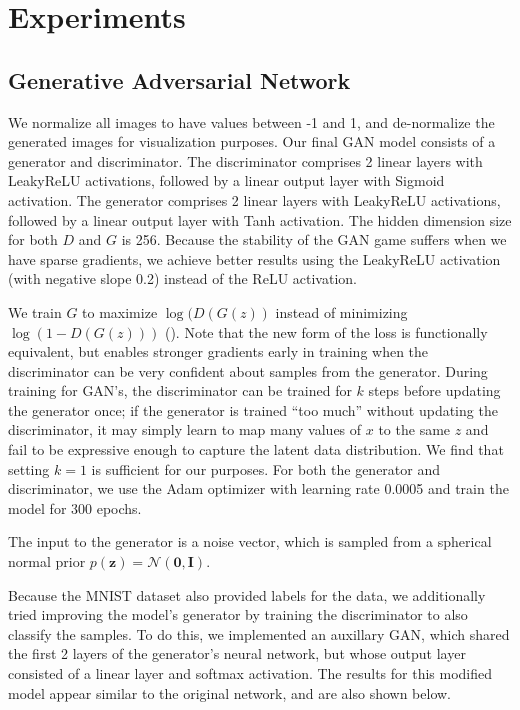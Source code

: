 \documentclass[11pt]{article}
\begin{document}
\section{Experiments}


\subsection{Generative Adversarial Network} 
We normalize all images to have values between -1 and 1, and de-normalize the generated images for visualization purposes. Our final GAN model consists of a generator and discriminator. The discriminator comprises 2 linear layers with LeakyReLU activations, followed by a linear output layer with Sigmoid activation. The generator comprises 2 linear layers with LeakyReLU activations, followed by a linear output layer with Tanh activation. The hidden dimension size for both $D$ and $G$ is 256. Because the stability of the GAN game suffers when we have sparse gradients, we achieve better results using the LeakyReLU activation (with negative slope 0.2) instead of the ReLU activation.

We train $G$ to maximize $\log(D(G(z))$ instead of minimizing $\log(1-D(G(z)))$ (\cite{gan}). Note that the new form of the loss is functionally equivalent, but enables stronger gradients early in training when the discriminator can be very confident about samples from the generator. During training for GAN's, the discriminator can be trained for $k$ steps before updating the generator once; if the generator is trained ``too much'' without updating the discriminator, it may simply learn to map many values of $x$ to the same $z$ and fail to be expressive enough to capture the latent data distribution. We find that setting $k=1$ is sufficient for our purposes. For both the generator and discriminator, we use the Adam optimizer with learning rate 0.0005 and train the model for 300 epochs.

The input to the generator is a noise vector, which is sampled from a spherical normal prior $p(\mathbf{z}) = \mathcal{N}(\mathbf{0}, \mathbf{I})$.

Because the MNIST dataset also provided labels for the data, we additionally tried improving the model's generator by training the discriminator to also classify the samples. To do this, we implemented an auxillary GAN, which shared the first 2 layers of the generator's neural network, but whose output layer consisted of a linear layer and softmax activation. The results for this modified model appear similar to the original network, and are also shown below.
\end{document}
